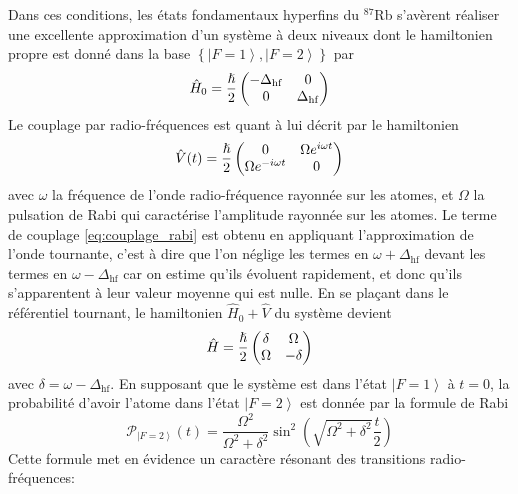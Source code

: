 Dans ces conditions, les états fondamentaux hyperfins du ${}^{87}$Rb s'avèrent réaliser une excellente approximation d'un système à deux niveaux dont le hamiltonien propre est donné dans la base $\left\lbrace \left|F=1\right\rangle, \left|F=2\right\rangle \right\rbrace$ par
\begin{equation}
\hat{H}_0=\frac{\hslash}{2} \begin{pmatrix}
-\Delta_{\mathrm{hf}} & 0 \\
0 & \Delta_{\mathrm{hf}}
\end{pmatrix}
\end{equation}
Le couplage par radio-fréquences est quant à lui décrit par le hamiltonien
\begin{equation}
\hat{V}(t)=\frac{\hslash}{2} \begin{pmatrix}
0 & \Omega e^{i \omega t} \\
\Omega e^{-i\omega t} & 0
\end{pmatrix}
\label{eq:couplage_rabi}
\end{equation}
avec $\omega$ la fréquence de l'onde radio-fréquence rayonnée sur les atomes, et $\Omega$ la pulsation de Rabi qui caractérise l'amplitude rayonnée sur les atomes. Le terme de couplage \ref{eq:couplage_rabi} est obtenu en appliquant l'approximation de l'onde tournante, c'est à dire que l'on néglige les termes en $\omega +\Delta_{\mathrm{hf}}$ devant les termes en $\omega - \Delta_{\mathrm{hf}}$ car on estime qu'ils évoluent rapidement, et donc qu'ils s'apparentent à leur valeur moyenne qui est nulle. En se plaçant dans le référentiel tournant, le hamiltonien $\hat{H}_0+\hat{V}$ du système devient
\begin{equation}
\hat{H}=\frac{\hslash}{2} \begin{pmatrix}
\delta & \Omega \\
\Omega & -\delta
\end{pmatrix}
\end{equation}
avec $\delta=\omega- \Delta_{\mathrm{hf}}$. En supposant que le système est dans l'état $\left| F=1 \right\rangle$ à $t=0$, la probabilité d'avoir l'atome dans l'état $\left| F=2 \right\rangle$ est donnée par la formule de Rabi \citep{basdevant2002mecanique}
\begin{equation}
\mathcal{P}_{\left| F=2 \right\rangle}(t)= \frac{\Omega^2}{\Omega^2+\delta^2} \sin^2{\left(\sqrt{\Omega^2+\delta^2} \frac{t}{2} \right) }
\label{eq:rabi_formule}
\end{equation}
Cette formule met en évidence un caractère résonant des transitions radio-fréquences:
